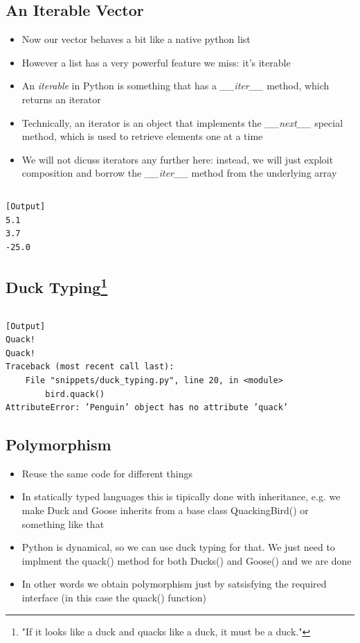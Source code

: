 \subsection{An Iterable Vector}

  \begin{itemize}
    \item Now our vector behaves a bit like a native python list
    \item However a list has a very powerful feature we miss: it's \alert{iterable}
    \item An \emph{iterable} in Python is something that has a
          \emph{\_\_iter\_\_} method, which returns an \alert{iterator}
    \item Technically, an iterator is an object that implements the
          \emph{\_\_next\_\_} special method, which is used to retrieve elements
          one at a time
    \item We will not dicuss iterators any further here: instead, we will just
          exploit composition and borrow the \emph{\_\_iter\_\_} method from the 
          underlying array
  \end{itemize}

\inputminted{python}{snippets/vector_iterable.py}
\begin{verbatim}
[Output]
5.1
3.7
-25.0
\end{verbatim} 

\subsection{Duck Typing\footnote{"If it looks like a duck and quacks like a duck, it must be a duck."}}


\inputminted{python}{snippets/duck_typing.py}

\begin{verbatim}
[Output]
Quack!
Quack!
Traceback (most recent call last):
    File "snippets/duck_typing.py", line 20, in <module>
        bird.quack()
AttributeError: ’Penguin’ object has no attribute ’quack’
\end{verbatim} 


\subsection{Polymorphism}
  
  \begin{itemize}
    \item Reuse the same code for different things
    \item In statically typed languages this is tipically done with inheritance,
          e.g. we make Duck and Goose inherits from a base class QuackingBird()
          or something like that
    \item Python is dynamical, so we can use duck typing for that.
          We just need to implment the quack() method for both Ducks() and Goose() 
          and we are done
    \item In other words we obtain polymorphism just by satsisfying the required \alert{interface}
          (in this case the quack() function)
  \end{itemize}
  
